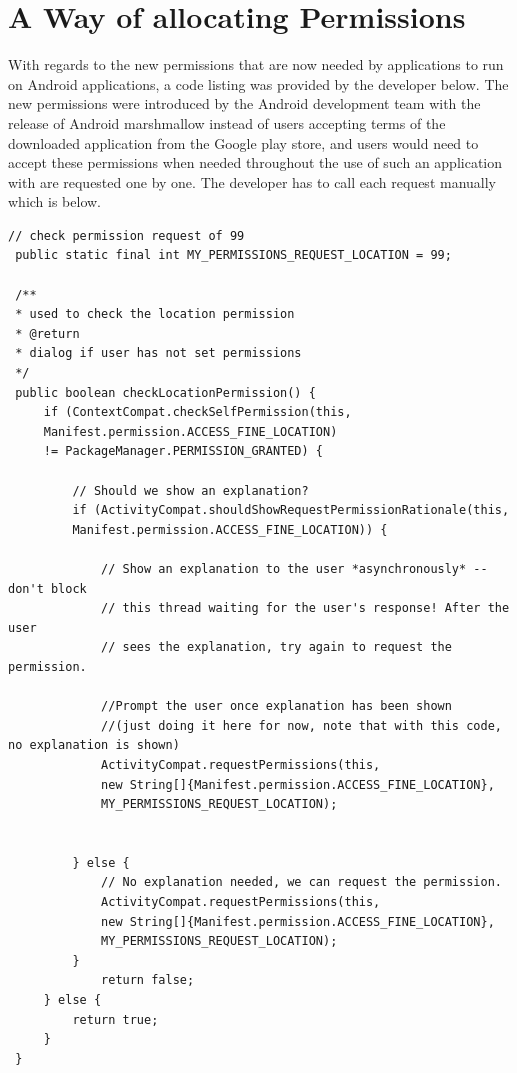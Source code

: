 \section{A Way of allocating Permissions}
With regards to the new permissions that are now needed by applications to run on Android applications, a code listing was provided by the developer below. The new permissions were introduced by the Android development team with the release of Android marshmallow instead of users accepting terms of the downloaded application from the Google play store, and users would need to accept these permissions when needed throughout the use of such an application with are requested one by one. The developer has to call each request manually which is below.
\begin{lstlisting}[style=myCustomMatlabStyle, basicstyle=\small, breaklines, caption=Permissions Example,captionpos=b] 
 // check permission request of 99
 public static final int MY_PERMISSIONS_REQUEST_LOCATION = 99;
 
 /**
 * used to check the location permission
 * @return
 * dialog if user has not set permissions
 */
 public boolean checkLocationPermission() {
     if (ContextCompat.checkSelfPermission(this,
     Manifest.permission.ACCESS_FINE_LOCATION)
     != PackageManager.PERMISSION_GRANTED) {
     
         // Should we show an explanation?
         if (ActivityCompat.shouldShowRequestPermissionRationale(this,
         Manifest.permission.ACCESS_FINE_LOCATION)) {
         
             // Show an explanation to the user *asynchronously* -- don't block
             // this thread waiting for the user's response! After the user
             // sees the explanation, try again to request the permission.
             
             //Prompt the user once explanation has been shown
             //(just doing it here for now, note that with this code, no explanation is shown)
             ActivityCompat.requestPermissions(this,
             new String[]{Manifest.permission.ACCESS_FINE_LOCATION},
             MY_PERMISSIONS_REQUEST_LOCATION);
         
         
         } else {
             // No explanation needed, we can request the permission.
             ActivityCompat.requestPermissions(this,
             new String[]{Manifest.permission.ACCESS_FINE_LOCATION},
             MY_PERMISSIONS_REQUEST_LOCATION);
         }
             return false;
     } else {
         return true;
     }
 }
\end{lstlisting}
